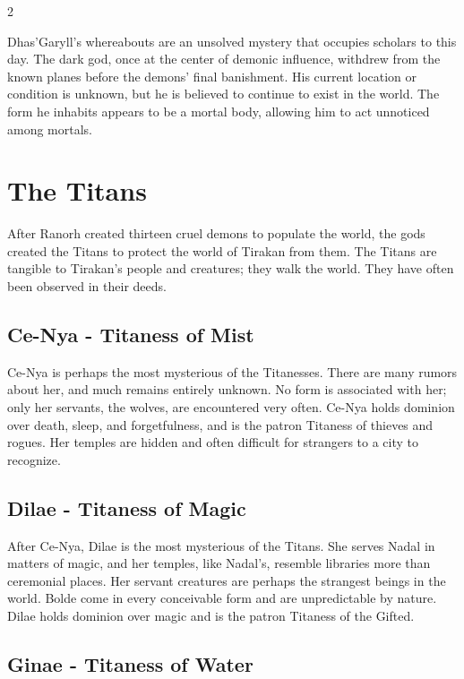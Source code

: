 \begin{multicols}{2}
{Dhas'Garyll's whereabouts are an unsolved mystery that occupies scholars to this day. The dark god, once at the center of demonic influence, withdrew from the known planes before the demons' final banishment. His current location or condition is unknown, but he is believed to continue to exist in the world. The form he inhabits appears to be a mortal body, allowing him to act unnoticed among mortals.

\section{The Titans}\label{sec:die-titanen}

After Ranorh created thirteen cruel demons to populate the world, the gods created the Titans to protect the world of Tirakan from them. The Titans are tangible to Tirakan's people and creatures; they walk the world. They have often been observed in their deeds.

\subsection{Ce-Nya - Titaness of Mist}\label{subsec:ce-nya-titanin-des-nebels}

Ce-Nya is perhaps the most mysterious of the Titanesses. There are many rumors about her, and much remains entirely unknown. No form is associated with her; only her servants, the wolves, are encountered very often. Ce-Nya holds dominion over death, sleep, and forgetfulness, and is the patron Titaness of thieves and rogues. Her temples are hidden and often difficult for strangers to a city to recognize.

\subsection{Dilae - Titaness of Magic}\label{subsec:dilae-titanin-der-magie}

After Ce-Nya, Dilae is the most mysterious of the Titans. She serves Nadal in matters of magic, and her temples, like Nadal's, resemble libraries more than ceremonial places. Her servant creatures are perhaps the strangest beings in the world. Bolde come in every conceivable form and are unpredictable by nature. Dilae holds dominion over magic and is the patron Titaness of the Gifted.

\subsection{Ginae - Titaness of Water}\label{subsec:ginae-titanin-des-wassers}

}
\end{multicols}
